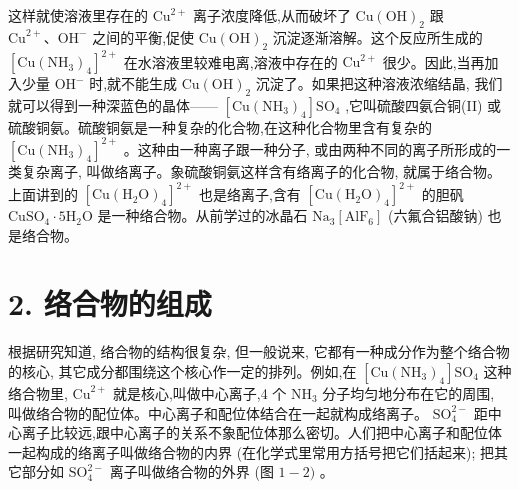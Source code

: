 \documentclass[10pt]{article}
\newcommand{\customfootnote}[1]{
  \let\thefootnote\relax\footnotetext{#1}
}
\begin{document}
这样就使溶液里存在的 \({\mathrm{{Cu}}}^{2 + }\) 离子浓度降低,从而破坏了 \(\mathrm{{Cu}}{\left( \mathrm{{OH}}\right) }_{2}\) 跟 \({\mathrm{{Cu}}}^{2 + }\text{、}{\mathrm{{OH}}}^{ - }\) 之间的平衡,促使 \(\mathrm{{Cu}}{\left( \mathrm{{OH}}\right) }_{2}\) 沉淀逐渐溶解。这个反应所生成的 \({\left\lbrack \mathrm{{Cu}}{\left( {\mathrm{{NH}}}_{3}\right) }_{4}\right\rbrack }^{2 + }\) 在水溶液里较难电离,溶液中存在的 \({\mathrm{{Cu}}}^{2 + }\) 很少。因此,当再加入少量 \({\mathrm{{OH}}}^{ - }\) 时,就不能生成 \(\mathrm{{Cu}}{\left( \mathrm{{OH}}\right) }_{2}\) 沉淀了。如果把这种溶液浓缩结晶, 我们就可以得到一种深蓝色的晶体—— \(\left\lbrack {\mathrm{{Cu}}{\left( {\mathrm{{NH}}}_{3}\right) }_{4}}\right\rbrack {\mathrm{{SO}}}_{4}\) ,它叫硫酸四氨合铜(II) 或硫酸铜氨。硫酸铜氨是一种复杂的化合物,在这种化合物里含有复杂的 \({\left\lbrack \mathrm{{Cu}}{\left( {\mathrm{{NH}}}_{3}\right) }_{4}\right\rbrack }^{2 + }\) 。这种由一种离子跟一种分子, 或由两种不同的离子所形成的一类复杂离子, 叫做络离子。象硫酸铜氨这样含有络离子的化合物, 就属于络合物。上面讲到的 \({\left\lbrack \mathrm{{Cu}}{\left( {\mathrm{H}}_{2}\mathrm{O}\right) }_{4}\right\rbrack }^{2 + }\) 也是络离子,含有 \({\left\lbrack \mathrm{{Cu}}{\left( {\mathrm{H}}_{2}\mathrm{O}\right) }_{4}\right\rbrack }^{2 + }\) 的胆矾 \({\mathrm{{CuSO}}}_{4} \cdot 5{\mathrm{H}}_{2}\mathrm{O}\) 是一种络合物。从前学过的冰晶石 \({\mathrm{{Na}}}_{3}\left\lbrack {\mathrm{{AlF}}}_{6}\right\rbrack\) (六氟合铝酸钠) 也是络合物。

\section*{2. 络合物的组成}

根据研究知道, 络合物的结构很复杂, 但一般说来, 它都有一种成分作为整个络合物的核心, 其它成分都围绕这个核心作一定的排列。例如,在 \(\left\lbrack {\mathrm{{Cu}}{\left( {\mathrm{{NH}}}_{3}\right) }_{4}}\right\rbrack {\mathrm{{SO}}}_{4}\) 这种络合物里, \({\mathrm{{Cu}}}^{2 + }\) 就是核心,叫做中心离子,4 个 \({\mathrm{{NH}}}_{3}\) 分子均匀地分布在它的周围, 叫做络合物的配位体。中心离子和配位体结合在一起就构成络离子。 \({\mathrm{{SO}}}_{4}^{2 - }\) 距中心离子比较远,跟中心离子的关系不象配位体那么密切。人们把中心离子和配位体一起构成的络离子叫做络合物的内界 (在化学式里常用方括号把它们括起来); 把其它部分如 \({\mathrm{{SO}}}_{4}^{2 - }\) 离子叫做络合物的外界 (图 \(1 - 2)\) 。

\customfootnote{

① 括号内的数字表示化合价。

}
\end{document}
